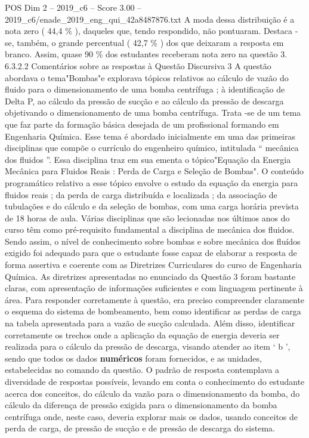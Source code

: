 \begin{textsample}{POS Dim 2 – 2019\_c6 – Score 3.00 – 2019\_c6/enade\_2019\_eng\_qui\_42a8487876.txt}
A moda dessa distribuição é a nota zero ( 44,4 \% ), daqueles que, tendo respondido, não pontuaram.
Destaca -se, também, o grande percentual ( 42,7 \% ) dos que deixaram a resposta em branco.
Assim, quase 90 \% dos estudantes receberam nota zero na questão 3. 6.3.2.2 Comentários sobre as respostas à Questão Discursiva 3 A questão abordava o tema"Bombas"e explorava tópicos relativos ao cálculo de vazão do fluido para o dimensionamento de uma bomba centrífuga ; à identificação de Delta P, ao cálculo da pressão de sucção e ao cálculo da pressão de descarga objetivando o dimensionamento de uma bomba centrífuga.
Trata -se de um tema que faz parte da formação básica desejada de um profissional formando em Engenharia Química.
Esse tema é abordado inicialmente em uma das primeiras disciplinas que compõe o currículo do engenheiro químico, intitulada “ mecânica dos fluidos ”.
Essa disciplina traz em sua ementa o tópico"Equação da Energia Mecânica para Fluidos Reais : Perda de Carga e Seleção de Bombas".
O conteúdo programático relativo a esse tópico envolve o estudo da equação da energia para fluidos reais ; da perda de carga distribuída e localizada ; da associação de tubulações e do cálculo e da seleção de bombas, com uma carga horária prevista de 18 horas de aula.
Várias disciplinas que são lecionadas nos últimos anos do curso têm como pré-requisito fundamental a disciplina de mecânica dos fluidos.
Sendo assim, o nível de conhecimento sobre bombas e sobre mecânica dos fluídos exigido foi adequado para que o estudante fosse capaz de elaborar a resposta de forma assertiva e coerente com as Diretrizes Curriculares do curso de Engenharia Química.
As diretrizes apresentadas no enunciado da Questão 3 foram bastante claras, com apresentação de informações suficientes e com linguagem pertinente à área.
Para responder corretamente à questão, era preciso compreender claramente o esquema do sistema de bombeamento, bem como identificar as perdas de carga na tabela apresentada para a vazão de sucção calculada.
Além disso, identificar corretamente os trechos onde a aplicação da equação de energia deveria ser realizada para o cálculo da pressão de descarga, visando atender ao item ‘ b ’, sendo que todos os dados \textbf{numéricos} foram fornecidos, e as unidades, estabelecidas no comando da questão.
O padrão de resposta contemplava a diversidade de respostas possíveis, levando em conta o conhecimento do estudante acerca dos conceitos, do cálculo da vazão para o dimensionamento da bomba, do cálculo da diferença de pressão exigida para o dimensionamento da bomba centrífuga onde, neste caso, deveria explorar mais os dados, usando conceitos de perda de carga, de pressão de sucção e de pressão de descarga do sistema.

\end{textsample}
